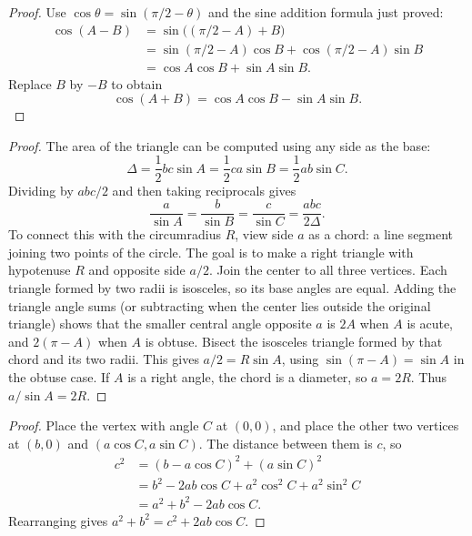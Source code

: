 
\begin{proof}
Use $\cos\theta=\sin(\pi/2-\theta)$ and the sine addition formula
just proved:
\begin{align*}
\cos(A-B)
&=\sin\bigl((\pi/2-A)+B\bigr)\\
&=\sin(\pi/2-A)\cos B+\cos(\pi/2-A)\sin B\\
&=\cos A\cos B+\sin A\sin B.
\end{align*}
Replace $B$ by $-B$ to obtain
$$\cos(A+B)=\cos A\cos B-\sin A\sin B.$$
\end{proof}


\begin{proof}
The area of the triangle can be computed using any side as the base:
$$
\Delta=\frac12bc\sin A=\frac12ca\sin B=\frac12ab\sin C.
$$
Dividing by $abc/2$ and then taking reciprocals gives
$$
\frac{a}{\sin A}=\frac{b}{\sin B}=\frac{c}{\sin C}
=\frac{abc}{2\Delta}.
$$
To connect this with the circumradius $R$, view side $a$ as a chord:
a line segment joining two points of the circle.
The goal is to make a right triangle with hypotenuse $R$ and opposite
side $a/2$.
Join the center to all three vertices. Each triangle formed by two radii
is isosceles, so its base angles are equal. Adding the triangle angle sums
(or subtracting when the center lies outside the original triangle)
shows that the smaller central angle opposite $a$ is $2A$ when $A$ is
acute, and $2(\pi-A)$ when $A$ is obtuse. Bisect the isosceles triangle
formed by that chord and its two radii. This gives
$a/2=R\sin A$, using $\sin(\pi-A)=\sin A$ in the obtuse case.
If $A$ is a right angle, the chord is a diameter, so $a=2R$.
Thus $a/\sin A=2R$.
\end{proof}


\begin{proof}
Place the vertex with angle $C$ at $(0,0)$, and place the other two vertices
at $(b,0)$ and $(a\cos C,a\sin C)$. The distance between them is $c$, so
\begin{align*}
c^2&=(b-a\cos C)^2+(a\sin C)^2\\
&=b^2-2ab\cos C+a^2\cos^2 C+a^2\sin^2 C\\
&=a^2+b^2-2ab\cos C.
\end{align*}
Rearranging gives $a^2+b^2=c^2+2ab\cos C$.
\end{proof}

